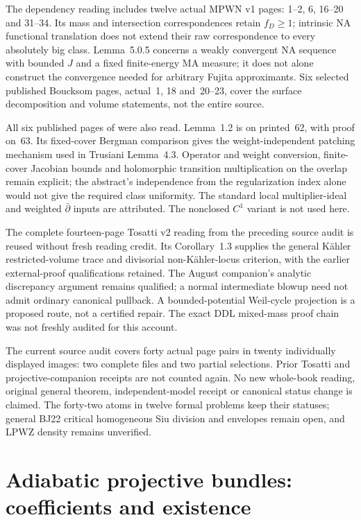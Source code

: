 The dependency reading includes twelve actual MPWN v1 pages:
1--2, 6, 16--20 and 31--34. Its mass and intersection
correspondences retain $f_D\geq1$; intrinsic NA functional
translation does not extend their raw correspondence to every
absolutely big class. Lemma~5.0.5 concerns a weakly convergent
NA sequence with bounded $J$ and a fixed finite-energy MA
measure; it does not alone construct the convergence needed
for arbitrary Fujita approximants. Six selected published
Boucksom pages, actual~1, 18 and~20--23, cover the surface
decomposition and volume statements, not the entire source.

All six published pages of \cite{Popovici04Regularization}
were also read. Lemma~1.2 is on printed~62, with proof on~63.
Its fixed-cover Bergman comparison gives the weight-independent
patching mechanism used in Trusiani Lemma~4.3. Operator and
weight conversion, finite-cover Jacobian bounds and holomorphic
transition multiplication on the overlap remain explicit; the
abstract's independence from the regularization index alone
would not give the required class uniformity. The standard
local multiplier-ideal and weighted $\bar\partial$ inputs are
attributed. The nonclosed $C^1$ variant is not used here.

The complete fourteen-page Tosatti v2 reading from the preceding
source audit is reused without fresh reading credit. Its
Corollary~1.3 supplies the general K\"ahler restricted-volume
trace and divisorial non-K\"ahler-locus criterion, with the earlier
external-proof qualifications retained. The August companion's
analytic discrepancy argument remains qualified; a normal
intermediate blowup need not admit ordinary canonical pullback.
A bounded-potential Weil-cycle projection is a proposed route,
not a certified repair. The exact DDL mixed-mass proof chain
was not freshly audited for this account.

The current source audit covers forty actual page pairs in twenty
individually displayed images: two complete files and two partial
selections. Prior Tosatti and projective-companion receipts are
not counted again. No new whole-book reading, original general
theorem, independent-model receipt or canonical status change
is claimed. The forty-two atoms in twelve formal problems keep
their statuses; general BJ22 critical homogeneous Siu division
and envelopes remain open, and LPWZ density remains unverified.

\section{Adiabatic projective bundles: coefficients and existence}
\label{sec:appL-adiabatic-bundles-boundary}

